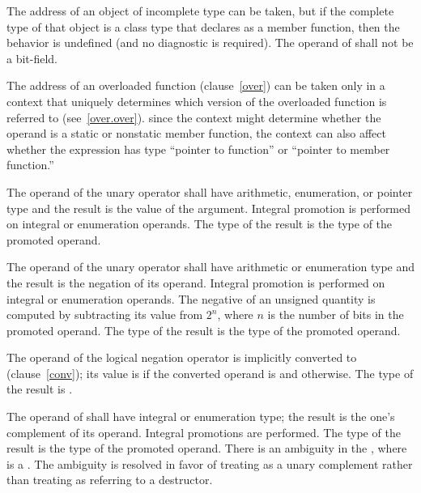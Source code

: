\pnum
The address of an object of incomplete type can be taken, but if the
complete type of that object is a class type that declares
 as a member function, then the behavior is
undefined (and no diagnostic is required). The operand of \tcode{\&}
shall not be a bit-field.

\pnum
{}%
The address of an overloaded function (clause~\ref{over}) can be taken
only in a context that uniquely determines which version of the
overloaded function is referred to (see~\ref{over.over}).
\enternote 
since the context might determine whether the operand is a static or
nonstatic member function, the context can also affect whether the
expression has type ``pointer to function'' or ``pointer to member
function.''
\exitnote 

\pnum
{}%
The operand of the unary \tcode{+} operator shall have arithmetic,
enumeration, or pointer type and the result is the value of the
argument. Integral promotion is performed on integral or enumeration
operands. The type of the result is the type of the promoted operand.

\pnum
{}%
The operand of the unary \tcode{-} operator shall have arithmetic or
enumeration type and the result is the negation of its operand. Integral
promotion is performed on integral or enumeration operands. The negative
of an unsigned quantity is computed by subtracting its value from $2^n$,
where $n$ is the number of bits in the promoted operand. The type of the
result is the type of the promoted operand.

\pnum
{}%
The operand of the logical negation operator \tcode{!} is implicitly
converted to  (clause~\ref{conv}); its value is 
if the converted operand is  and  otherwise.
The type of the result is .

\pnum
{}%
The operand of \tcode{\~{}} shall have integral or enumeration type; the
result is the one's complement of its operand. Integral promotions are
performed. The type of the result is the type of the promoted operand.
There is an ambiguity in the 
, where  is a . The
ambiguity is resolved in favor of treating \tcode{\~{}} as a unary
complement rather than treating  as referring to a
destructor.

